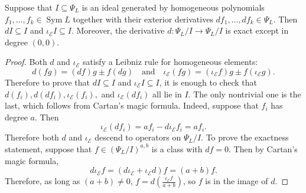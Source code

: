 \documentclass[10pt,a4paper]{amsart}
\newcommand{\Sym}{\operatorname{Sym}}
\begin{document}
\begin{lemma}\label{lem:diffclosedexact}
    Suppose that $I \subseteq \Psi_L$ is an ideal generated by homogeneous polynomials
    $f_1, \ldots, f_k \in \Sym L$ together with their exterior derivatives 
    $df_1, \ldots, df_k \in \Psi_L$. Then $dI \subseteq I$ and 
    $\iota_{\mathcal{E}} I \subseteq I$. Moreover, the derivative $d \colon \Psi_L/I \to \Psi_L/I$ is exact except in degree $(0,0)$.
\end{lemma}

\begin{proof}
    Both $d$ and $\iota_{\mathcal{E}}$ satisfy a Leibniz rule for homogeneous elements:
    \[
        d(fg) = (df)g \pm f(dg)\quad \text{and} \quad 
        \iota_{\mathcal{E}}(fg) = (\iota_{\mathcal{E}} f)g \pm 
        f(\iota_{\mathcal{E}} g).
    \]
    Therefore to prove that $dI \subseteq I$ and $\iota_{\mathcal{E}}I 
    \subseteq I$, it is enough to check that $d(f_i), d(df_i), 
    \iota_{\mathcal{E}}(f_i),$ and $\iota_{\mathcal{E}}(df_i)$ all lie in $I$. The only 
    nontrivial one is the last, which follows from Cartan's magic 
    formula. Indeed, suppose that $f_i$ has degree $a$. Then
    \[
        \iota_{\mathcal{E}}(df_i) = a f_i - d\iota_{\mathcal{E}}f_i 
    = a f_i.
    \]
    Therefore both $d$ and $\iota_{\mathcal{E}}$ descend to operators on 
    $\Psi_{L}/I$. To prove the exactness statement, suppose that $f \in 
    (\Psi_L/I)^{a,b}$ is a class with $df = 0$. Then by Cartan's magic formula,
    \[
        d\iota_{\mathcal{E}} f = (d\iota_{\mathcal{E}} + \iota_{\mathcal{E}}d)f = (a+b)f.
    \]
    Therefore, as long as $(a+b) \not= 0$, $f = d 
    (\frac{\iota_{\mathcal{E}}f}{a+b})$, so $f$ is in the image of $d$. 
\end{proof}
\end{document}
